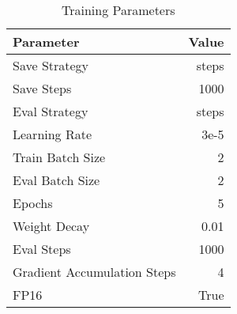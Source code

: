 \begin{table}[ht]
    \centering
    \footnotesize
    \begin{tabular}{@{}l|r@{}}
        \toprule
        \textbf{Parameter} & \textbf{Value} \\ \midrule
        Save Strategy                 & steps           \\
        Save Steps                    & 1000            \\
        Eval Strategy                 & steps           \\
        Learning Rate                 & 3e-5            \\
        Train Batch Size              & 2               \\
        Eval Batch Size               & 2               \\
        Epochs                        & 5               \\
        Weight Decay                  & 0.01            \\
        Eval Steps                    & 1000            \\
        Gradient Accumulation Steps   & 4               \\
        FP16                          & True            \\
        \bottomrule
    \end{tabular}
    \caption{Training Parameters}
    \label{tab:training_parameters}
\end{table}
